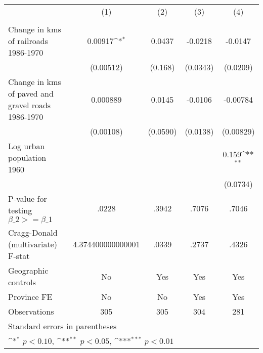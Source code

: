 {
\def\sym#1{\ifmmode^{#1}\else\(^{#1}\)\fi}
\begin{tabular}{l*{4}{c}}
\hline\hline
                &\multicolumn{1}{c}{(1)}&\multicolumn{1}{c}{(2)}&\multicolumn{1}{c}{(3)}&\multicolumn{1}{c}{(4)}\\
                &\multicolumn{1}{c}{}&\multicolumn{1}{c}{}&\multicolumn{1}{c}{}&\multicolumn{1}{c}{}\\
\hline
Change in kms of railroads 1986-1970&  0.00917\sym{*}  &   0.0437         &  -0.0218         &  -0.0147         \\
                &(0.00512)         &  (0.168)         & (0.0343)         & (0.0209)         \\
[1em]
Change in kms of paved and gravel roads 1986-1970& 0.000889         &   0.0145         &  -0.0106         & -0.00784         \\
                &(0.00108)         & (0.0590)         & (0.0138)         &(0.00829)         \\
[1em]
Log urban population 1960&                  &                  &                  &    0.159\sym{**} \\
                &                  &                  &                  & (0.0734)         \\
\hline
P-value for testing $\beta\_{2} >= \beta\_{1}$&    .0228         &    .3942         &    .7076         &    .7046         \\
Cragg-Donald (multivariate) F-stat&4.374400000000001         &    .0339         &    .2737         &    .4326         \\
Geographic controls&       No         &      Yes         &      Yes         &      Yes         \\
Province FE     &       No         &       No         &      Yes         &      Yes         \\
Observations    &      305         &      305         &      304         &      281         \\
\hline\hline
\multicolumn{5}{l}{\footnotesize Standard errors in parentheses}\\
\multicolumn{5}{l}{\footnotesize \sym{*} \(p<0.10\), \sym{**} \(p<0.05\), \sym{***} \(p<0.01\)}\\
\end{tabular}
}
